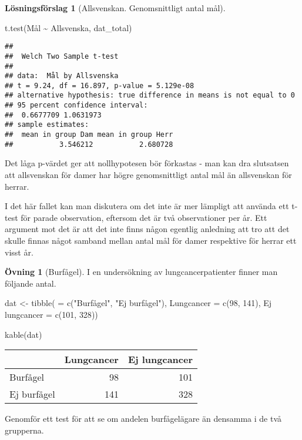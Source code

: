 \documentclass[
]{book}
\newenvironment{Shaded}{\begin{snugshade}}{\end{snugshade}}
\newcommand{\AttributeTok}[1]{\textcolor[rgb]{0.77,0.63,0.00}{#1}}
\newcommand{\DecValTok}[1]{\textcolor[rgb]{0.00,0.00,0.81}{#1}}
\newcommand{\FunctionTok}[1]{\textcolor[rgb]{0.00,0.00,0.00}{#1}}
\newcommand{\NormalTok}[1]{#1}
\newcommand{\OtherTok}[1]{\textcolor[rgb]{0.56,0.35,0.01}{#1}}
\newcommand{\SpecialCharTok}[1]{\textcolor[rgb]{0.00,0.00,0.00}{#1}}
\newcommand{\StringTok}[1]{\textcolor[rgb]{0.31,0.60,0.02}{#1}}
\theoremstyle{definition}
\theoremstyle{definition}
\theoremstyle{definition}
\newtheorem{exercise}{Övning}[chapter]
\theoremstyle{definition}
\newtheorem{hypothesis}{Lösningsförslag}[chapter]
\theoremstyle{remark}
\begin{document}
\begin{hypothesis}[Allsvenskan. Genomsnittligt antal mål]
\begin{Shaded}
\begin{Highlighting}[]
\FunctionTok{t.test}\NormalTok{(Mål }\SpecialCharTok{\textasciitilde{}}\NormalTok{ Allsvenska, dat\_total)}
\end{Highlighting}
\end{Shaded}

\begin{verbatim}
## 
##  Welch Two Sample t-test
## 
## data:  Mål by Allsvenska
## t = 9.24, df = 16.897, p-value = 5.129e-08
## alternative hypothesis: true difference in means is not equal to 0
## 95 percent confidence interval:
##  0.6677709 1.0631973
## sample estimates:
##  mean in group Dam mean in group Herr 
##           3.546212           2.680728
\end{verbatim}

Det låga p-värdet ger att nollhypotesen bör förkastas - man kan dra slutsatsen att allsvenskan för damer har högre genomsnittligt antal mål än allsvenskan för herrar.

I det här fallet kan man diskutera om det inte är mer lämpligt att använda ett t-test för parade observation, eftersom det är två observationer per år. Ett argument mot det är att det inte finns någon egentlig anledning att tro att det skulle finnas något samband mellan antal mål för damer respektive för herrar ett visst år.
\end{hypothesis}

\begin{exercise}[Burfågel]
I en undersökning av lungcancerpatienter finner man följande antal.

\begin{Shaded}
\begin{Highlighting}[]
\NormalTok{dat }\OtherTok{\textless{}{-}} \FunctionTok{tibble}\NormalTok{(}\StringTok{\textasciigrave{}}\AttributeTok{ }\StringTok{\textasciigrave{}} \OtherTok{=} \FunctionTok{c}\NormalTok{(}\StringTok{"Burfågel"}\NormalTok{, }\StringTok{"Ej burfågel"}\NormalTok{),}
              \AttributeTok{Lungcancer =} \FunctionTok{c}\NormalTok{(}\DecValTok{98}\NormalTok{, }\DecValTok{141}\NormalTok{),}
              \StringTok{\textasciigrave{}}\AttributeTok{Ej lungcancer}\StringTok{\textasciigrave{}} \OtherTok{=} \FunctionTok{c}\NormalTok{(}\DecValTok{101}\NormalTok{, }\DecValTok{328}\NormalTok{))}

\FunctionTok{kable}\NormalTok{(dat)}
\end{Highlighting}
\end{Shaded}

\begin{table}
\centering
\begin{tabular}[t]{lrr}
\toprule
  & Lungcancer & Ej lungcancer\\
\midrule
Burfågel & 98 & 101\\
Ej burfågel & 141 & 328\\
\bottomrule
\end{tabular}
\end{table}

Genomför ett test för att se om andelen burfågelägare än densamma i de två grupperna.
\end{exercise}
\end{document}
